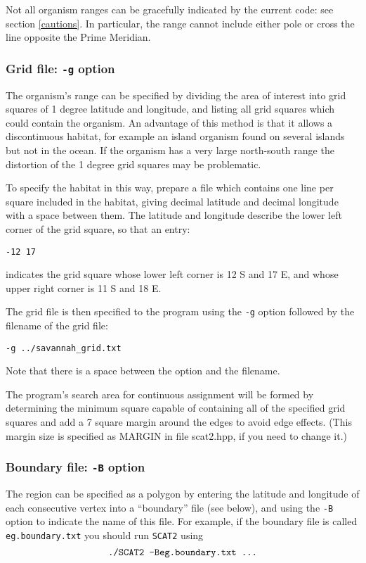 \documentclass[10pt,titlepage,times,letterpaper]{article}
\def\SCAT{{\tt SCAT2} }
\begin{document}
Not all organism ranges can be gracefully indicated by the current code:
see section \ref{cautions}.  In particular, the range cannot include either pole
or cross the line opposite the Prime Meridian.

\subsubsection{Grid file:  {\tt -g} option}

The organism's range can be specified by dividing the area of interest into grid
squares of 1 degree latitude and longitude, and listing all grid squares which could
contain the organism.  An advantage of this method is that it allows a discontinuous
habitat, for example an island organism found on several islands but not in the ocean.
If the organism has a very large 
north-south range the distortion of the 1 degree grid squares may be problematic.

To specify the habitat in this way, prepare a file which contains one line per
square included in the habitat, giving decimal latitude and decimal longitude with
a space between them.  The latitude and longitude describe the lower left corner of
the grid square, so that an entry:

{\tt -12 17}

indicates the grid square whose lower left corner is 12 S and 17 E, and whose upper right 
corner is 11 S and 18 E.

The grid file is then specified to the program using the {\tt -g} option followed
by the filename of the grid file:

{\tt -g ../savannah\_grid.txt}

Note that there is a space between the option and the filename.

The program's search area for continuous assignment will be formed by determining
the minimum square capable of containing all of the specified 
grid squares and add a 7 square margin around the edges to avoid edge effects.
(This margin size is specified as MARGIN in file scat2.hpp, if you need
to change it.)

\subsubsection{Boundary file:  {\tt -B} option}
The region can be specified as a polygon by entering the latitude and longitude of
each consecutive vertex into a ``boundary'' file (see below), and using
the {\tt -B} option to indicate the name of this file.
For example, if the boundary file is called {\tt eg.boundary.txt} you
should run \SCAT using
$$\text{\tt ./SCAT2 -Beg.boundary.txt ...}$$ 
\end{document}
